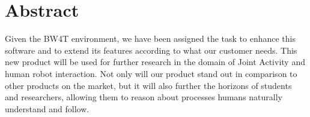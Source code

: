 \chapter*{Abstract}
Given the BW4T environment, we have been assigned the task to enhance this software and to extend its features according to what our customer needs. This new product will be used for further research in the domain of Joint Activity and human robot interaction. Not only will our product stand out in comparison to other products on the market, but it will also further the horizons of students and researchers, allowing them to reason about processes humans naturally understand and follow.